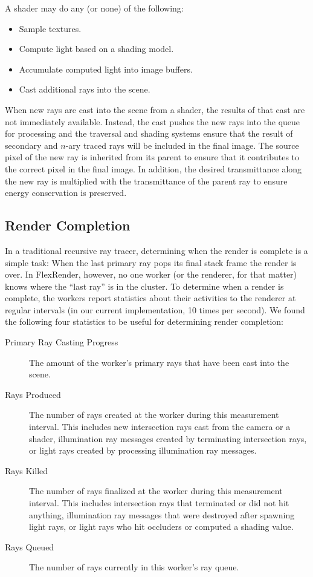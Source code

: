 \documentclass[a4paper,twoside]{article}
\begin{document}
A shader may do any (or none) of the following:

\begin{itemize}
    \item Sample textures.
    \item Compute light based on a shading model.
    \item Accumulate computed light into image buffers.
    \item Cast additional rays into the scene.
\end{itemize}

When new rays are cast into the scene from a shader, the results of that cast
are not immediately available. Instead, the cast pushes the new rays into the
queue for processing and the traversal and shading systems ensure that the
result of secondary and $n$-ary traced rays will be included in the final image.
The source pixel of the new ray is inherited from its parent to ensure that it
contributes to the correct pixel in the final image. In addition, the desired
transmittance along the new ray is multiplied with the transmittance of the
parent ray to ensure energy conservation is preserved.

\subsection{Render Completion}
\label{completion}

In a traditional recursive ray tracer, determining when the render is complete
is a simple task: When the last primary ray pops its final stack frame
the render is over. In FlexRender, however, no one worker (or the renderer, for
that matter) knows where the ``last ray'' is in the cluster. To determine when a render is
complete,  the workers report statistics about their activities to the renderer
at regular intervals (in our current implementation, 10 times per second). We
found the following four statistics to be useful for determining render
completion:

\begin{description}
   \item[Primary Ray Casting Progress] The amount of the worker's primary rays
      that have been cast into the scene.
   \item[Rays Produced] The number of rays created at the worker during this
      measurement interval. This includes new intersection rays cast from the
      camera or a shader, illumination ray messages created by terminating
      intersection rays, or light rays created by processing illumination ray
      messages.
   \item[Rays Killed] The number of rays finalized at the worker during this
      measurement interval. This includes intersection rays that terminated or
      did not hit anything, illumination ray messages that were destroyed after
      spawning light rays, or light rays who hit occluders or computed a shading
      value.
   \item[Rays Queued] The number of rays currently in this worker's ray queue.
\end{description}
\end{document}

